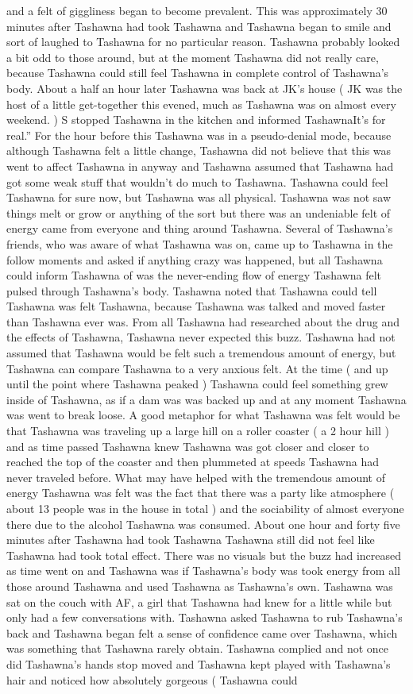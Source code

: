 \documentclass[12pt]{book}
\begin{document}
and a felt of giggliness began to become prevalent. This was approximately 30 minutes after Tashawna had took Tashawna and Tashawna began to smile and sort of laughed to Tashawna for no particular reason. Tashawna probably looked a bit odd to those around, but at the moment Tashawna did not really care, because Tashawna could still feel Tashawna in complete control of Tashawna's body. About a half an hour later Tashawna was back at JK's house ( JK was the host of a little get-together this evened, much as Tashawna was on almost every weekend. ) S stopped Tashawna in the kitchen and informed TashawnaIt's for real.'' For the hour before this Tashawna was in a pseudo-denial mode, because although Tashawna felt a little change, Tashawna did not believe that this was went to affect Tashawna in anyway and Tashawna assumed that Tashawna had got some weak stuff that wouldn't do much to Tashawna. Tashawna could feel Tashawna for sure now, but Tashawna was all physical. Tashawna was not saw things melt or grow or anything of the sort but there was an undeniable felt of energy came from everyone and thing around Tashawna. Several of Tashawna's friends, who was aware of what Tashawna was on, came up to Tashawna in the follow moments and asked if anything crazy was happened, but all Tashawna could inform Tashawna of was the never-ending flow of energy Tashawna felt pulsed through Tashawna's body. Tashawna noted that Tashawna could tell Tashawna was felt Tashawna, because Tashawna was talked and moved faster than Tashawna ever was. From all Tashawna had researched about the drug and the effects of Tashawna, Tashawna never expected this buzz. Tashawna had not assumed that Tashawna would be felt such a tremendous amount of energy, but Tashawna can compare Tashawna to a very anxious felt. At the time ( and up until the point where Tashawna peaked ) Tashawna could feel something grew inside of Tashawna, as if a dam was was backed up and at any moment Tashawna was went to break loose. A good metaphor for what Tashawna was felt would be that Tashawna was traveling up a large hill on a roller coaster ( a 2 hour hill ) and as time passed Tashawna knew Tashawna was got closer and closer to reached the top of the coaster and then plummeted at speeds Tashawna had never traveled before. What may have helped with the tremendous amount of energy Tashawna was felt was the fact that there was a party like atmosphere ( about 13 people was in the house in total ) and the sociability of almost everyone there due to the alcohol Tashawna was consumed. About one hour and forty five minutes after Tashawna had took Tashawna Tashawna still did not feel like Tashawna had took total effect. There was no visuals but the buzz had increased as time went on and Tashawna was if Tashawna's body was took energy from all those around Tashawna and used Tashawna as Tashawna's own. Tashawna was sat on the couch with AF, a girl that Tashawna had knew for a little while but only had a few conversations with. Tashawna asked Tashawna to rub Tashawna's back and Tashawna began felt a sense of confidence came over Tashawna, which was something that Tashawna rarely obtain. Tashawna complied and not once did Tashawna's hands stop moved and Tashawna kept played with Tashawna's hair and noticed how absolutely gorgeous ( Tashawna could 
\end{document}
